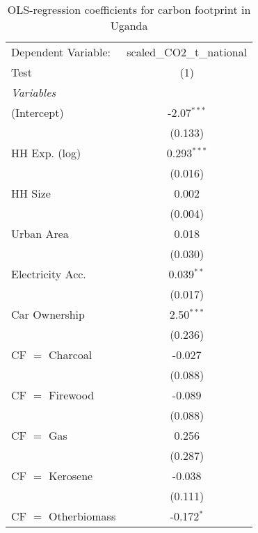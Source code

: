 
\begin{table}[htbp!]
   \centering
   \small
   \begin{adjustbox}{width = 1\textwidth, max height = 0.95\textheight, center}
      \begin{threeparttable}[b]
         \caption{\label{tab:OLS_2_UGA} OLS-regression coefficients for carbon footprint in Uganda}
         \begin{tabular}{lc}
            \tabularnewline \midrule \midrule
            Dependent Variable: & scaled\_CO2\_t\_national\\     
            Test                & (1)\\  
            \midrule
            \emph{Variables}\\
            (Intercept)         & -2.07$^{***}$\\   
                                & (0.133)\\   
            HH Exp. (log)       & 0.293$^{***}$\\   
                                & (0.016)\\   
            HH Size             & 0.002\\   
                                & (0.004)\\   
            Urban Area          & 0.018\\   
                                & (0.030)\\   
            Electricity Acc.    & 0.039$^{**}$\\   
                                & (0.017)\\   
            Car Ownership       & 2.50$^{***}$\\   
                                & (0.236)\\   
            CF $=$ Charcoal     & -0.027\\   
                                & (0.088)\\   
            CF $=$ Firewood     & -0.089\\   
                                & (0.088)\\   
            CF $=$ Gas          & 0.256\\   
                                & (0.287)\\   
            CF $=$ Kerosene     & -0.038\\   
                                & (0.111)\\   
            CF $=$ Otherbiomass & -0.172$^{*}$\\   

\end{tabular}
\end{threeparttable}
\end{adjustbox}
\end{table}
